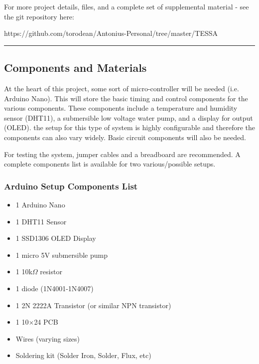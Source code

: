 \documentclass{article}
\begin{document}
		For more project details, files, and a complete set of supplemental material - see the git repository here:
		\begin{mdframed}[backgroundcolor=gray!08, linewidth=1pt]
			https://github.com/torodean/Antonius-Personal/tree/master/TESSA
		\end{mdframed}
	
	\hrule

	\begin{multicols}{2} %
		
		\section{Components and Materials}
		
		At the heart of this project, some sort of micro-controller will be needed (i.e. Arduino Nano). This will store the basic timing and control components for the various components. These components include a temperature and humidity sensor (DHT11), a submersible low voltage water pump, and a display for output (OLED). the setup for this type of system is highly configurable and therefore the components can also vary widely. Basic circuit components will also be needed.
		
		For testing the system, jumper cables and a breadboard are recommended. A complete components list is available for two various/possible setups.
		
		\subsubsection{Arduino Setup Components List}
		\begin{itemize}[itemsep=1pt, parsep=1pt]
			\item 1 Arduino Nano
			\item 1 DHT11 Sensor
			\item 1 SSD1306 OLED Display
			\item 1 micro 5V submersible pump
			\item 1 10k$\Omega$ resistor
			\item 1 diode (1N4001-1N4007)
			\item 1 2N 2222A Transistor (or similar NPN transistor)
			\item 1 10$\times$24 PCB
			\item Wires (varying sizes)
			\item Soldering kit (Solder Iron, Solder, Flux, etc)
		\end{itemize}
		

\end{multicols}
\end{document}
